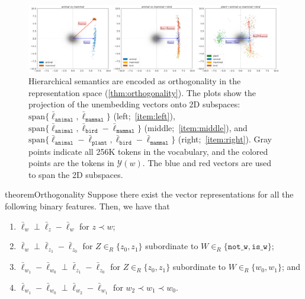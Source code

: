 \documentclass{article}
\newcommand{\ConceptValue}[1]{\texttt{#1}}
\newcommand{\yquad}{\mathcal{Y}}
\begin{document}
\begin{figure}[t]
  \centering
  \includegraphics[width=1.0\linewidth]{figures/three_2d_plots.png}
  \caption{Hierarchical semantics are encoded as orthogonality in the representation space (\cref{thm:orthogonality}).
  The plots show the projection of the unembedding vectors onto 2D subspaces: $\mathrm{span}\{\bar\ell_{\ConceptValue{animal}}, \bar\ell_{\ConceptValue{mammal}}\}$ (left;~\ref{item:left}), $\mathrm{span}\{\bar\ell_{\ConceptValue{animal}},\bar\ell_{\ConceptValue{bird}} - \bar\ell_{\ConceptValue{mammal}}\}$ (middle;~\ref{item:middle}), and $\mathrm{span}\{\bar\ell_{\ConceptValue{animal}} - \bar\ell_{\ConceptValue{plant}}, \bar\ell_{\ConceptValue{bird}} - \bar\ell_{\ConceptValue{mammal}}\}$ (right;~\ref{item:right}).
  Gray points indicate all 256K tokens in the vocabulary, and the colored points are the tokens in $\yquad(w)$.
  The blue and red vectors are used to span the 2D subspaces.}
  \label{fig:three_2d_plots}
\end{figure}

\begin{restatable}{theorem}{Orthogonality}\label{thm:orthogonality}
  Suppose there exist the vector representations for all the following binary features.
  Then, we have that
  \begin{enumerate}[label=(\alph*)]
    \item $\bar\ell_{w} \perp \bar\ell_{z} - \bar\ell_w$ for $z \prec w$; \label{item:left}
    \item $\bar{\ell}_{w} \perp \bar\ell_{z_1} - \bar\ell_{z_0}$ for $Z \in_R \{z_0, z_1\}$ subordinate to $W \in_R \{\ConceptValue{not\_w}, \ConceptValue{is\_w}\}$; \label{item:middle}
    \item $\bar{\ell}_{w_1} - \bar{\ell}_{w_0}  \perp \bar\ell_{z_1} - \bar\ell_{z_0}$ for $Z \in_R \{z_0, z_1\}$ subordinate to $W \in_R \{w_0, w_1\}$; and \label{item:right}
    \item $\bar\ell_{w_1}-\bar\ell_{w_0} \perp \bar\ell_{w_2} - \bar\ell_{w_1}$ for $w_2 \prec w_1 \prec w_0$.\label{item:grandparent}
  \end{enumerate}
\end{restatable}
\end{document}
